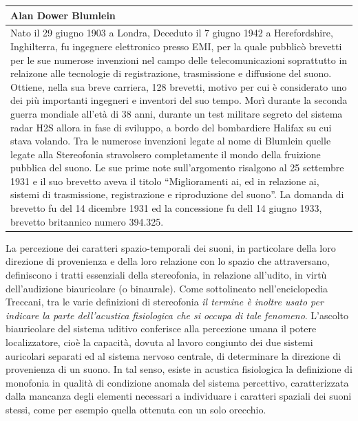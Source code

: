 \vfill\null

\begin{tabular}{L{.969\textwidth}}%
\toprule
	\textbf{Alan Dower Blumlein}\\
\midrule
Nato il 29 giugno 1903 a Londra, Deceduto il 7 giugno 1942 a Herefordshire,
Inghilterra, fu ingegnere elettronico presso EMI, per la quale pubblicò brevetti
per le sue numerose invenzioni nel campo delle telecomunicazioni soprattutto in
relaizone alle tecnologie di registrazione, trasmissione e diffusione del suono.
Ottiene, nella sua breve carriera, 128 brevetti, motivo per cui è considerato
uno dei più importanti ingegneri e inventori del suo tempo. Morì durante la
seconda guerra mondiale all'età di 38 anni, durante un test militare segreto del
sistema radar H2S allora in fase di sviluppo, a bordo del bombardiere Halifax
su cui stava volando. Tra le numerose invenzioni legate al nome di Blumlein
quelle legate alla Stereofonia stravolsero completamente il mondo della
fruizione pubblica del suono. Le sue prime note sull'argomento risalgono al 25
settembre 1931 e il suo brevetto aveva il titolo “Miglioramenti ai, ed in
relazione ai, sistemi di trasmissione, registrazione e riproduzione del suono”.
La domanda di brevetto fu del 14 dicembre 1931 ed la concessione fu dell
14 giugno 1933, brevetto britannico numero 394.325.\\
\bottomrule
\end{tabular}

\clearpage

La percezione dei caratteri spazio-temporali dei suoni, in particolare della
loro direzione di provenienza e della loro relazione con lo spazio che
attraversano, definiscono i tratti essenziali della stereofonia, in relazione
all'udito, in virtù dell’audizione biauricolare (o binaurale). Come sottolineato
nell'enciclopedia Treccani, tra le varie definizioni di stereofonia \emph{il
termine è inoltre usato per indicare la parte dell’acustica fisiologica
che si occupa di tale fenomeno}. L'ascolto biauricolare del sistema uditivo
conferisce alla percezione umana il potere localizzatore, cioè la capacità,
dovuta al lavoro congiunto dei due sistemi auricolari separati ed al sistema
nervoso centrale, di determinare la direzione di provenienza di un suono. In tal
senso, esiste in acustica fisiologica la definizione di monofonia in qualità di
condizione anomala del sistema percettivo, caratterizzata dalla mancanza degli
elementi necessari a individuare i caratteri spaziali dei suoni stessi, come per
esempio quella ottenuta con un solo orecchio.

